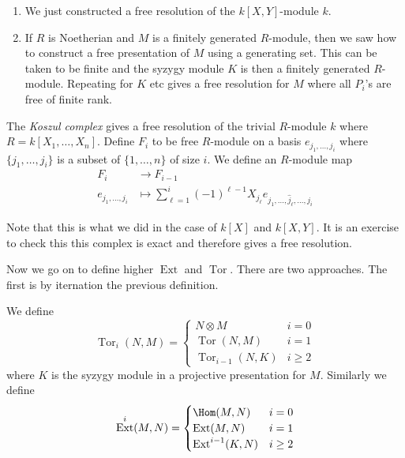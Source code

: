 \documentclass[a4paper]{article}
\DeclareMathOperator{\Tor}{Tor}
\DeclareMathOperator{\Ext}{Ext}
\begin{document}
\begin{remark}\leavevmode
  \begin{enumerate}
  \item We just constructed a free resolution of the \(k[X, Y]\)-module \(k\).
  \item If \(R\) is Noetherian and \(M\) is a finitely generated \(R\)-module, then we saw how to construct a free presentation of \(M\) using a generating set. This can be taken to be finite and the syzygy module \(K\) is then a finitely generated \(R\)-module. Repeating for \(K\) etc gives a free resolution for \(M\) where all \(P_i\)'s are free of finite rank.
  \end{enumerate}
\end{remark}

\begin{definition}
  The \emph{Koszul complex} gives a free resolution of the trivial \(R\)-module \(k\) where \(R = k[X_1, \dots, X_n]\). Define \(F_i\) to be free \(R\)-module on a basis \(e_{j_1, \dots, j_i}\) where \(\{j_1, \dots, j_i\}\) is a subset of \(\{1, \dots, n\}\) of size \(i\). We define an \(R\)-module map
  \begin{align*}
    F_i &\to F_{i - 1} \\
    e_{j_1, \dots, j_i} &\mapsto \sum_{\ell = 1}^i (-1)^{\ell - 1} X_{j_\ell} e_{j_1, \dots, \hat j_{\ell}, \dots, j_i}
  \end{align*}
\end{definition}

Note that this is what we did in the case of \(k[X]\) and \(k[X, Y]\). It is an exercise to check this this complex is exact and therefore gives a free resolution.

Now we go on to define higher \(\Ext\) and \(\Tor\). There are two approaches. The first is by iternation the previous definition.

\begin{definition}
  We define
  \[
    \Tor_i(N, M) =
    \begin{cases}
      N \otimes M & i = 0 \\
      \Tor(N, M) & i = 1 \\
      \Tor_{i - 1}(N, K) & i \geq 2
    \end{cases}
  \]
  where \(K\) is the syzygy module in a projective presentation for \(M\). Similarly we define
  \[
    \Ext^i(M, N) =
    \begin{cases}
      \Hom(M, N) & i = 0 \\
      \Ext(M, N) & i = 1 \\
      \Ext^{i - 1}(K, N) & i \geq 2
    \end{cases}
  \]
\end{definition}
\end{document}
